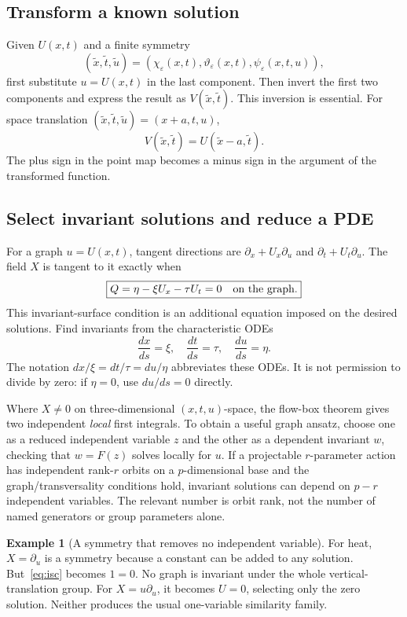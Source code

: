 \documentclass[11pt,a4paper]{article}
\numberwithin{equation}{section}
\theoremstyle{definition}
\newtheorem{example}[definition]{Example}
\theoremstyle{plain}
\theoremstyle{remark}
\begin{document}
\subsection{Transform a known solution}\label{sec:transform}
Given $U(x,t)$ and a finite symmetry
\[
(\widetilde x,\widetilde t,\widetilde u)
=(\chi_\varepsilon(x,t),\vartheta_\varepsilon(x,t),\psi_\varepsilon(x,t,u)),
\]
first substitute $u=U(x,t)$ in the last component. Then invert the first two components and express the result as $V(\widetilde x,\widetilde t)$. This inversion is essential. For space translation $(\widetilde x,\widetilde t,\widetilde u)=(x+a,t,u)$,
\[
V(\widetilde x,\widetilde t)=U(\widetilde x-a,\widetilde t).
\]
The plus sign in the point map becomes a minus sign in the argument of the transformed function.

\subsection{Select invariant solutions and reduce a PDE}\label{sec:reduction}
For a graph $u=U(x,t)$, tangent directions are $\partial_x+U_x\partial_u$ and $\partial_t+U_t\partial_u$. The field $X$ is tangent to it exactly when
\begin{equation}\label{eq:isc}
\boxed{Q=\eta-\xi U_x-\tau U_t=0\quad\hbox{on the graph}.}
\end{equation}
This invariant-surface condition is an additional equation imposed on the desired solutions. Find invariants from the characteristic ODEs
\[
\frac{dx}{ds}=\xi,\quad\frac{dt}{ds}=\tau,\quad\frac{du}{ds}=\eta.
\]
The notation $dx/\xi=dt/\tau=du/\eta$ abbreviates these ODEs. It is not permission to divide by zero: if $\eta=0$, use $du/ds=0$ directly.

Where $X\ne0$ on three-dimensional $(x,t,u)$-space, the flow-box theorem gives two independent \emph{local} first integrals. To obtain a useful graph ansatz, choose one as a reduced independent variable $z$ and the other as a dependent invariant $w$, checking that $w=F(z)$ solves locally for $u$. If a projectable $r$-parameter action has independent rank-$r$ orbits on a $p$-dimensional base and the graph/transversality conditions hold, invariant solutions can depend on $p-r$ independent variables. The relevant number is orbit rank, not the number of named generators or group parameters alone.

\begin{example}[A symmetry that removes no independent variable]
For heat, $X=\partial_u$ is a symmetry because a constant can be added to any solution. But~\eqref{eq:isc} becomes $1=0$. No graph is invariant under the whole vertical-translation group. For $X=u\partial_u$, it becomes $U=0$, selecting only the zero solution. Neither produces the usual one-variable similarity family.
\end{example}
\end{document}
